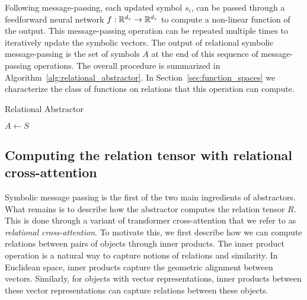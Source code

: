 Following message-passing, each updated symbol $s_i$, can be passed through a feedforward neural network $f:\mathbb{R}^{d_s}\rightarrow \mathbb{R}^{d_s}$ to compute a non-linear function of the output. %
This message-passing operation can be repeated multiple times to iteratively update the symbolic vectors.  The output of relational symbolic message-passing is the set of symbols $A$ at the end of this sequence of message-passing operations. The overall procedure is summarized in Algorithm~\ref{alg:relational_abstractor}. In Section~\ref{sec:function_spaces} we characterize the class of functions on relations that this operation can compute.

\begin{algorithm}[th!]
    \caption{Relational Abstractor}\label{alg:relational_abstractor}

    \vspace{1em}

    $A \gets S$

\end{algorithm}

\subsection{Computing the relation tensor with relational cross-attention}

Symbolic message passing is the first of the two main ingredients of abstractors. What remains is to describe how the abstractor computes the relation tensor $R$. This is done through a variant of transformer cross-attention that we refer to as \textit{relational cross-attention}.
To motivate this, we first describe how we can compute relations between pairs of objects through inner products. The inner product operation is a natural way to capture notions of relations and similarity. In Euclidean space, inner products capture the geometric alignment between vectors. Similarly, for objects with vector representations, inner products between these vector representations can capture relations between these objects.

